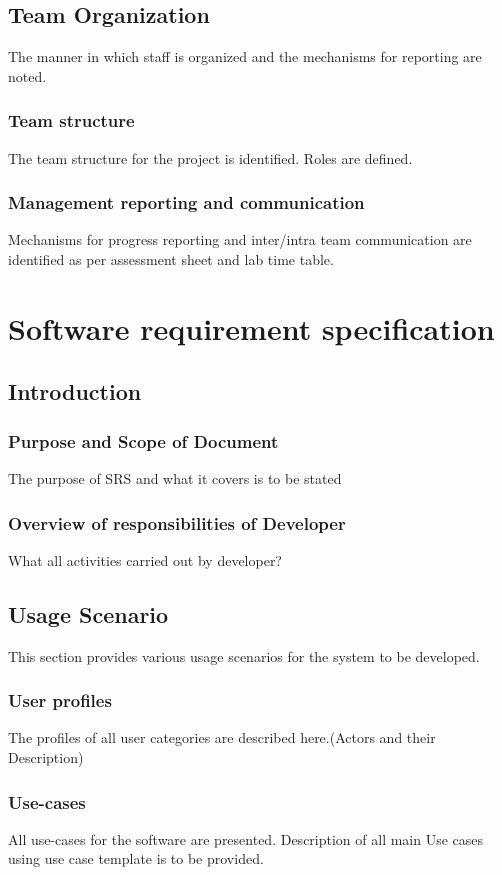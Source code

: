 \documentclass[oneside,a4paper,12pt]{report}
\begin{document}
 
\section{Team Organization}
The manner in which staff is organized and the mechanisms for reporting are noted.  
\subsection{Team structure}
The team structure for the project is identified. Roles are defined.

\subsection{Management reporting and communication}
Mechanisms for progress reporting and inter/intra team communication are identified as per assessment sheet and lab time table. 
 
\chapter{Software requirement specification  }

\section{Introduction}
\subsection{Purpose and Scope of Document}
The purpose of SRS and what it covers is to be stated 

\subsection{Overview of responsibilities of Developer}
What all activities carried out by developer?
  
\section{Usage Scenario}
This section provides various usage scenarios for the system to be developed.  
 \subsection{User profiles}  
The profiles of all user categories are described here.(Actors and their Description)

\subsection{Use-cases}
All use-cases for the software are presented. Description of all main Use cases using use case template is to be provided.
\end{document}
